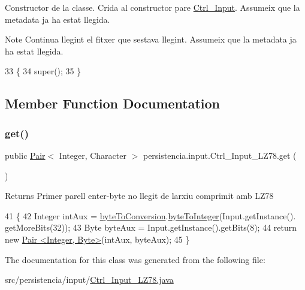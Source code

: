 Constructor de la classe. Crida al constructor pare \hyperlink{classpersistencia_1_1input_1_1Ctrl__Input}{Ctrl\+\_\+\+Input}. Assumeix que la metadata ja ha estat llegida. 

\begin{DoxyNote}{Note}
Continua llegint el fitxer que s\textquotesingle{}estava llegint. Assumeix que la metadata ja ha estat llegida. 
\end{DoxyNote}

\begin{DoxyCode}
33     \{
34         super();
35     \}
\end{DoxyCode}


\subsection{Member Function Documentation}
\mbox{\label{classpersistencia_1_1input_1_1Ctrl__Input__LZ78_ae09535962f284be3a76369845c15b78c}} 
\subsubsection{\texorpdfstring{get()}{get()}}
{\footnotesize\ttfamily public \hyperlink{classdomini_1_1utils_1_1Pair}{Pair}$<$ Integer, Character $>$ persistencia.\+input.\+Ctrl\+\_\+\+Input\+\_\+\+L\+Z78.\+get (\begin{DoxyParamCaption}{ }\end{DoxyParamCaption})\hspace{0.3cm}{\ttfamily [inline]}}

\begin{DoxyReturn}{Returns}
Primer parell enter-\/byte no llegit de l\textquotesingle{}arxiu comprimit amb L\+Z78 
\end{DoxyReturn}

\begin{DoxyCode}
41                                       \{
42         Integer intAux = \hyperlink{classdomini_1_1utils_1_1byteToConversion}{byteToConversion}.\hyperlink{classdomini_1_1utils_1_1byteToConversion_a3242a47adade49b6cfa6a9232944f587}{byteToInteger}(Input.getInstance().
      getMoreBits(32));
43         Byte byteAux = Input.getInstance().getBits(8);
44         \textcolor{keywordflow}{return} \textcolor{keyword}{new} \hyperlink{classdomini_1_1utils_1_1Pair}{Pair <Integer, Byte>}(intAux, byteAux);
45     \}
\end{DoxyCode}


The documentation for this class was generated from the following file\+:\begin{DoxyCompactItemize}
\item 
src/persistencia/input/\hyperlink{Ctrl__Input__LZ78_8java}{Ctrl\+\_\+\+Input\+\_\+\+L\+Z78.\+java}\end{DoxyCompactItemize}
